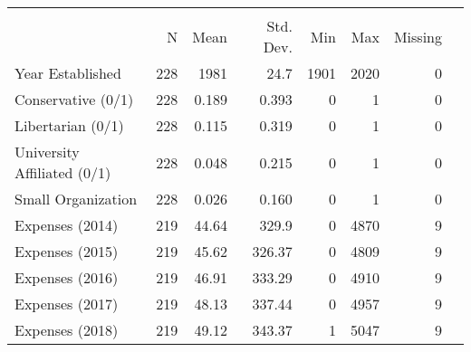 \def\sym#1{\ifmmode^{#1}\else\(^{#1}\)\fi}
\setlength\tabcolsep{10pt}
\begin{tabular}{@{\extracolsep{-10pt}}l*{1}{rrrrrrr}}
\toprule
                              &\multicolumn{6}{c}{}                                                         \\
                              &     N&        Mean&      Std. Dev.&      Min&         Max&            Missing\\
\midrule
Year Established            &       228&       1981&        24.7&           1901&      2020&          0\\
Conservative (0/1)          &        228&    0.189&        0.393&            0&             1&        0\\
Libertarian (0/1)           &       228&       0.115&        0.319&           0&           1&        0\\
University Affiliated (0/1) &       228&       0.048&        0.215&           0&           1&        0\\
Small Organization          &       228&       0.026&        0.160&           0&           1&        0\\
Expenses (2014)             &       219&      44.64&      329.9&              0&           4870&        9\\
Expenses (2015)             &       219&       45.62&        326.37&           0&           4809&        9\\
Expenses (2016)             &       219&       46.91&       333.29&           0&           4910&        9\\
Expenses (2017)             &       219&      48.13&       337.44&           0&           4957&        9\\
Expenses (2018)             &       219&       49.12&        343.37&           1&           5047&         9\\
\bottomrule
\end{tabular}